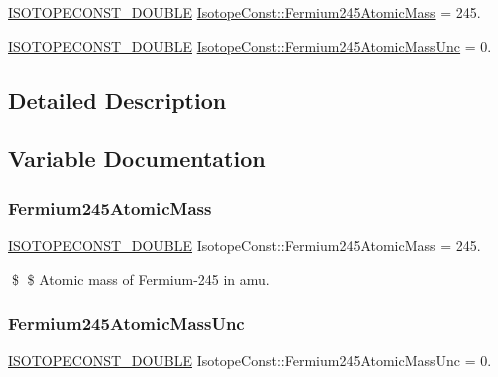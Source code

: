 \begin{DoxyCompactItemize}
\item 
\mbox{\hyperlink{group___isotope_const-_macros_ga8f45a7272ce02c0b4c65c44636ed719a}{I\+S\+O\+T\+O\+P\+E\+C\+O\+N\+S\+T\+\_\+\+D\+O\+U\+B\+LE}} \mbox{\hyperlink{group___isotope_const-_fermium-_fm245_ga65d6f9a468768f4feccbe1687b6b09af}{Isotope\+Const\+::\+Fermium245\+Atomic\+Mass}} = 245.
\item 
\mbox{\hyperlink{group___isotope_const-_macros_ga8f45a7272ce02c0b4c65c44636ed719a}{I\+S\+O\+T\+O\+P\+E\+C\+O\+N\+S\+T\+\_\+\+D\+O\+U\+B\+LE}} \mbox{\hyperlink{group___isotope_const-_fermium-_fm245_ga744b2d709e2b51e153baee6cfcaa5e62}{Isotope\+Const\+::\+Fermium245\+Atomic\+Mass\+Unc}} = 0.
\end{DoxyCompactItemize}


\subsection{Detailed Description}


\subsection{Variable Documentation}
\mbox{\label{group___isotope_const-_fermium-_fm245_ga65d6f9a468768f4feccbe1687b6b09af}} 
\subsubsection{\texorpdfstring{Fermium245\+Atomic\+Mass}{Fermium245AtomicMass}}
{\footnotesize\ttfamily \mbox{\hyperlink{group___isotope_const-_macros_ga8f45a7272ce02c0b4c65c44636ed719a}{I\+S\+O\+T\+O\+P\+E\+C\+O\+N\+S\+T\+\_\+\+D\+O\+U\+B\+LE}} Isotope\+Const\+::\+Fermium245\+Atomic\+Mass = 245.}

\$ \$ Atomic mass of Fermium-\/245 in amu. \mbox{\label{group___isotope_const-_fermium-_fm245_ga744b2d709e2b51e153baee6cfcaa5e62}} 
\subsubsection{\texorpdfstring{Fermium245\+Atomic\+Mass\+Unc}{Fermium245AtomicMassUnc}}
{\footnotesize\ttfamily \mbox{\hyperlink{group___isotope_const-_macros_ga8f45a7272ce02c0b4c65c44636ed719a}{I\+S\+O\+T\+O\+P\+E\+C\+O\+N\+S\+T\+\_\+\+D\+O\+U\+B\+LE}} Isotope\+Const\+::\+Fermium245\+Atomic\+Mass\+Unc = 0.}

